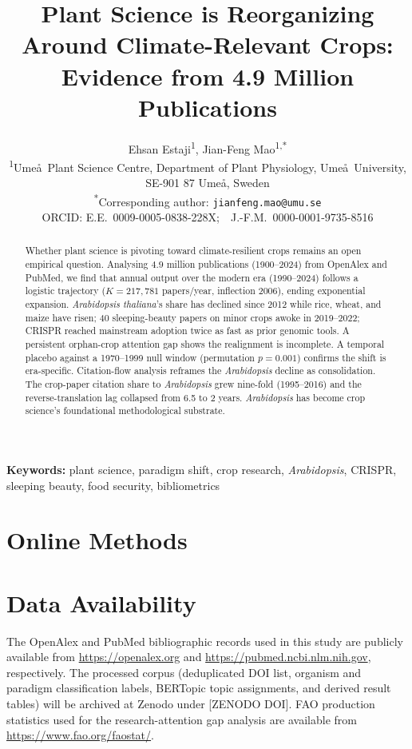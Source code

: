\documentclass[11pt,a4paper]{article}
\title{%
  \textbf{Plant Science is Reorganizing Around Climate-Relevant Crops:\\
  Evidence from 4.9 Million Publications}
}
\author{%
  Ehsan Estaji\textsuperscript{1},
  Jian-Feng Mao\textsuperscript{1,*}
  \\[0.5em]
  \small \textsuperscript{1}Ume\aa\ Plant Science Centre, Department of
         Plant Physiology, Ume\aa\ University, SE-901 87 Ume\aa, Sweden \\[0.3em]
  \small \textsuperscript{*}Corresponding author: \texttt{jianfeng.mao@umu.se}
  \\[0.2em]
  \small ORCID: E.E.\ 0009-0005-0838-228X;\ \ J.-F.M.\ 0000-0001-9735-8516
}
\date{}
\newcommand{\num}[1]{\ensuremath{\mathrm{#1}}}
\begin{document}
\maketitle

\begin{abstract}
Whether plant science is pivoting toward climate-resilient crops
remains an open empirical question. Analysing \num{4.9} million
publications (1900--2024) from OpenAlex and PubMed, we find that
annual output over the modern era (1990--2024) follows a logistic
trajectory ($K = 217{,}781$ papers/year, inflection 2006), ending
exponential expansion. \textit{Arabidopsis thaliana}'s share has declined since
2012 while rice, wheat, and maize have risen; 40 sleeping-beauty
papers on minor crops awoke in 2019--2022; CRISPR reached mainstream
adoption twice as fast as prior genomic tools. A persistent
orphan-crop attention gap shows the realignment is incomplete. A
temporal placebo against a 1970--1999 null window (permutation
$p = 0.001$) confirms the shift is era-specific. Citation-flow
analysis reframes the \textit{Arabidopsis} decline as consolidation.
The crop-paper citation share to \textit{Arabidopsis} grew nine-fold
(1995--2016) and the reverse-translation lag collapsed from 6.5 to
2 years.
\textit{Arabidopsis} has become crop science's foundational
methodological substrate.
\end{abstract}

\textbf{Keywords:} plant science, paradigm shift, crop research,
\textit{Arabidopsis}, CRISPR, sleeping beauty, food security, bibliometrics

\clearpage






\section*{Online Methods}


\section*{Data Availability}
The OpenAlex and PubMed bibliographic records used in this study are
publicly available from \url{https://openalex.org} and
\url{https://pubmed.ncbi.nlm.nih.gov}, respectively.
The processed corpus (deduplicated DOI list, organism and paradigm
classification labels, BERTopic topic assignments, and derived
result tables) will be archived at Zenodo under {[ZENODO DOI]}.
FAO production statistics used for the research-attention gap analysis
are available from \url{https://www.fao.org/faostat/}.
\end{document}
